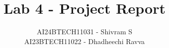 \documentclass{article}
\title{Lab 4 - Project Report}
\author{AI24BTECH11031 - Shivram S\\
AI23BTECH11022 - Dhadheechi Ravva}
\date{}
\begin{document}
\maketitle
\tableofcontents
\pagebreak
\end{document}
